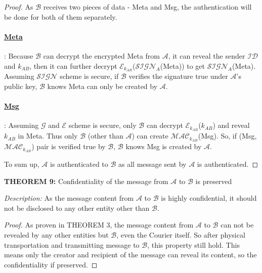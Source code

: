 \bigskip
\begin{proof}
As $\mathcal{B}$ receives two pieces of data - Meta and Msg, the authentication will be done for both of them separately.
\paragraph{\underline{Meta}}: Because $\mathcal{B}$ can decrypt the encrypted Meta from $\mathcal{A}$, it can reveal the sender $\mathcal{ID}$ and $k_{AB}$, then it can further decrypt $\mathcal{E}_{k_{AB}}$($\mathcal{SIGN}_A$(Meta)) to get $\mathcal{SIGN}_A$(Meta). Assuming $\mathcal{SIGN}$ scheme is secure, if $\mathcal{B}$ verifies the signature true under $\mathcal{A}$'s public key, $\mathcal{B}$ knows Meta can only be created by $\mathcal{A}$.

\paragraph{\underline{Msg}}: Assuming $\mathcal{G}$ and $\mathcal{E}$ scheme is secure, only $\mathcal{B}$ can decrypt $\mathcal{E}_{k_{AB}}$($k_{AB}$) and reveal $k_{AB}$ in Meta. Thus only $\mathcal{B}$ (other than $\mathcal{A}$) can create $\mathcal{MAC}_{k_{AB}}$(Msg). So, if (Msg, $\mathcal{MAC}_{k_{AB}}$) pair is verified true by $\mathcal{B}$, $\mathcal{B}$ knows Msg is created by $\mathcal{A}$.

To sum up, $\mathcal{A}$ is authenticated to $\mathcal{B}$ as all message sent by $\mathcal{A}$ is authenticated.
\end{proof}

\vspace{1cm}
\noindent
\textbf{THEOREM 9:} Confidentiality of the message from $\mathcal{A}$ to $\mathcal{B}$ is preserved

\bigskip
\noindent
\textit{Description: }As the message content from $ \mathcal{A} $ to $ \mathcal{B} $ is highly confidential, it should not be disclosed to any other entity other than $ \mathcal{B} $.

\begin{proof}
As proven in THEOREM 3, the message content from $\mathcal{A}$ to $\mathcal{B}$ can not be revealed by any other entities but $\mathcal{B}$, even the Courier itself. So after physical transportation and transmitting message to $\mathcal{B}$, this property still hold. This means only the creator and recipient of the message can reveal its content, so the confidentiality if preserved.
\end{proof}

